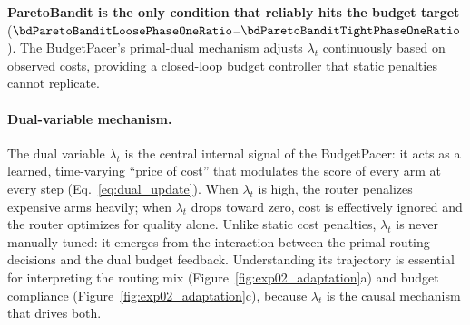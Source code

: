 \noindent
\textbf{ParetoBandit is the only condition that reliably hits the
budget target} ($\bdParetoBanditLoosePhaseOneRatio$--$\bdParetoBanditTightPhaseOneRatio$).  The BudgetPacer's
primal-dual mechanism adjusts $\lambda_t$ continuously based on
observed costs, providing a closed-loop budget controller that
static penalties cannot replicate.


\paragraph{Dual-variable mechanism.}
The dual variable $\lambda_t$ is the central internal signal of the
BudgetPacer: it acts as a learned, time-varying ``price of cost''
that modulates the score of every arm at every step
(Eq.~\ref{eq:dual_update}).
When $\lambda_t$ is high, the router penalizes expensive arms
heavily; when $\lambda_t$ drops toward zero, cost is effectively
ignored and the router optimizes for quality alone.
Unlike static cost penalties, $\lambda_t$ is never manually tuned:
it emerges from the interaction between the primal routing decisions
and the dual budget feedback.
Understanding its trajectory is essential for interpreting the
routing mix (Figure~\ref{fig:exp02_adaptation}a) and budget
compliance (Figure~\ref{fig:exp02_adaptation}c), because $\lambda_t$
is the causal mechanism that drives both.

